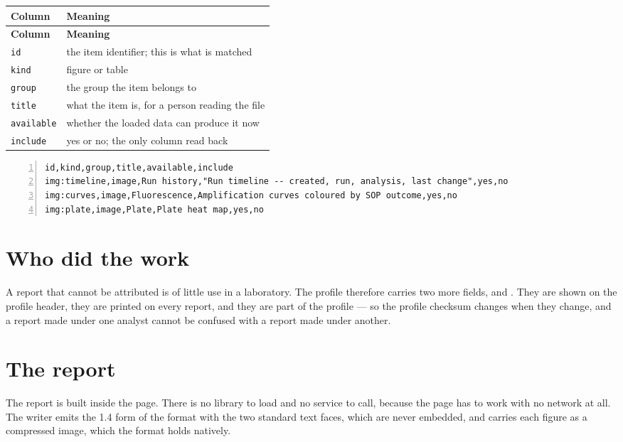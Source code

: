 {\small
\begin{xltabular}{\linewidth}{|X|l|}
\toprule \textbf{Column} & \textbf{Meaning} \\\midrule\endfirsthead
\toprule \textbf{Column} & \textbf{Meaning} \\\midrule\endhead
\texttt{id} & the item identifier; this is what is matched \\
\texttt{kind} & figure or table \\
\texttt{group} & the group the item belongs to \\
\texttt{title} & what the item is, for a person reading the file \\
\texttt{available} & whether the loaded data can produce it now \\
\texttt{include} & yes or no; the only column read back \\
\bottomrule
\end{xltabular}}

\begin{lstlisting}[style=vstyle,language=text,numbers=left,firstnumber=1]
id,kind,group,title,available,include
img:timeline,image,Run history,"Run timeline -- created, run, analysis, last change",yes,no
img:curves,image,Fluorescence,Amplification curves coloured by SOP outcome,yes,no
img:plate,image,Plate,Plate heat map,yes,no
\end{lstlisting}


\section{Who did the work}
A report that cannot be attributed is of little use in a laboratory. The profile
therefore carries two more fields,  and . They are
shown on the profile header, they are printed on every report, and they are part
of the profile --- so the profile checksum changes when they change, and a report
made under one analyst cannot be confused with a report made under another.

\section{The report}
The report is built inside the page. There is no library to load and no service to
call, because the page has to work with no network at all. The writer emits the
1.4 form of the format with the two standard text faces, which are never embedded,
and carries each figure as a compressed image, which the format holds natively.


